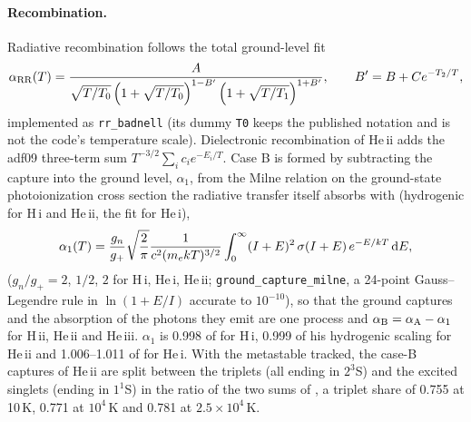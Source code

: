 \paragraph{Recombination.} Radiative recombination follows the \citet[2023 update]{Badnell2006}
total ground-level fit
\begin{equation}
\alpha_{\rm RR}(T) = \frac{A}
  {\sqrt{T/T_0}\left(1+\sqrt{T/T_0}\right)^{1-B'}
   \left(1+\sqrt{T/T_1}\right)^{1+B'}},
\qquad B' = B + C e^{-T_2/T},
\label{eq:ion:rrbadnell}
\end{equation}
implemented as \texttt{rr\_badnell} (its dummy \texttt{T0} keeps the
published notation and is not the code's temperature scale). Dielectronic
recombination of He\,{\sc ii} adds the adf09 three-term sum
$T^{-3/2}\sum_i c_i e^{-E_i/T}$. Case B is formed by subtracting the
capture into the ground level, $\alpha_1$, from the Milne relation on the
ground-state photoionization cross section the radiative transfer itself
absorbs with (hydrogenic for H\,{\sc i} and He\,{\sc ii}, the
\citet{Verner1996} fit for He\,{\sc i}),
\begin{equation}
\alpha_1(T) = \frac{g_n}{g_+}\sqrt{\frac{2}{\pi}}
   \frac{1}{c^2(m_ekT)^{3/2}}
   \int_0^\infty (I+E)^2\,\sigma(I+E)\,e^{-E/kT}\,{\rm d}E,
\label{eq:ion:milne}
\end{equation}
($g_n/g_+ = 2$, $1/2$, $2$ for H\,{\sc i}, He\,{\sc i}, He\,{\sc ii};
\texttt{ground\_capture\_milne}, a 24-point Gauss--Legendre rule in
$\ln(1+E/I)$ accurate to $10^{-10}$), so that the ground captures and the
absorption of the photons they emit are one process and
$\alpha_{\rm B} = \alpha_{\rm A}-\alpha_1$ for H\,{\sc ii}, He\,{\sc ii}
and He\,{\sc iii}. $\alpha_1$ is 0.998 of \citet{Hummer1994} for H\,{\sc i},
0.999 of his hydrogenic scaling for He\,{\sc ii} and 1.006--1.011 of
\citet{Hummer1998} for He\,{\sc i}. With the metastable tracked, the
case-B captures of He\,{\sc ii} are split between the triplets (all ending
in $2^3$S) and the excited singlets (ending in $1^1$S) in the ratio of the
two sums of \citet[Table~5]{Hummer1998}, a triplet share of 0.755 at
10\,K, 0.771 at $10^4$\,K and 0.781 at $2.5\times10^4$\,K.

